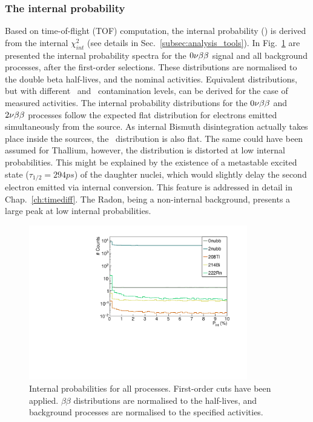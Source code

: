 \subsubsection{The internal probability}
Based on time-of-flight (TOF) computation, the internal probability (\Pint) is derived from the internal $\chi^{2}_{int}$ (see details in Sec.~\ref{subsec:analysis_tools}).
In Fig.~\ref{fig:Pint} are presented the internal probability spectra for the $0\nu\beta\beta$ signal and all background processes, after the first-order selections.
These distributions are normalised to the double beta half-lives, and the nominal activities.
Equivalent distributions, but with different \Bi\ and \Tl\ contamination levels, can be derived for the case of measured activities.
The internal probability distributions for the $0\nu\beta\beta$ and $2\nu\beta\beta$ processes follow the expected flat distribution for electrons emitted simultaneously from the source.
As internal Bismuth disintegration actually takes place inside the sources, the \Bi\ distribution is also flat.
The same could have been assumed for Thallium, however, the distribution is distorted at low internal probabilities.
This might be explained by the existence of a metastable excited state ($\tau_{1/2} = 294 ps$) of the daughter nuclei, which would slightly delay the second electron emitted via internal conversion.
This feature is addressed in detail in Chap.~\ref{ch:timediff}.
The Radon, being a non-internal background, presents a large peak at low internal probabilities.
\begin{figure}[h!]
  \centering
  \includegraphics[width=0.85\textwidth]{Sensitivity/fig_sensitivity/InternalProbability.pdf}
  \caption{Internal probabilities for all processes.
    First-order cuts have been applied.
    $\beta\beta$ distributions are normalised to the half-lives, and background processes are normalised to the specified activities.
    \label{fig:Pint}}
\end{figure}

